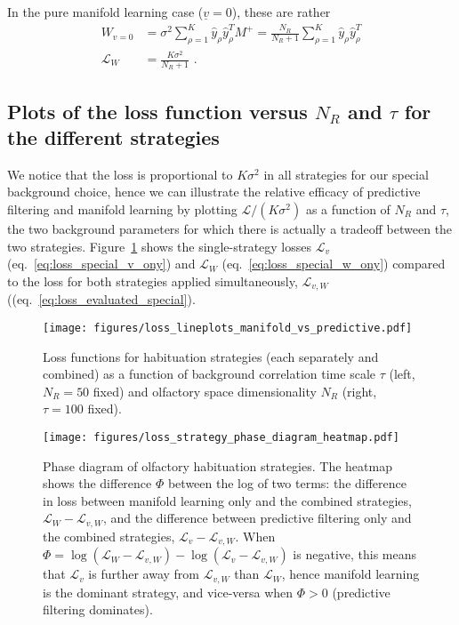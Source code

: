 \documentclass[letter, 12pt]{article}
\begin{document}
In the pure manifold learning case ($\underline{v} = 0$), these are rather
\begin{align}
	W_{v=0} &= \sigma^2 \sum_{\rho=1}^K \hat{y}_{\rho} \hat{y}_{\rho}^T M^+ =  \frac{N_R}{N_R + 1} \sum_{\rho=1}^K \hat{y}_{\rho} \hat{y}_{\rho}^T  \\
	\mathcal{L}_W &= \frac{K \sigma^2}{N_R + 1}
	\label{eq:loss_special_w_only} \,\, .
\end{align}


\subsection{Plots of the loss function versus $N_R$ and $\tau$ for the different strategies}
\label{subsec:plots}
We notice that the loss is proportional to $K \sigma^2$ in all strategies for our special background choice, hence we can illustrate the relative efficacy of predictive filtering and manifold learning by plotting $\mathcal{L} / (K\sigma^2)$ as a function of $N_R$ and $\tau$, the two background parameters for which there is actually a tradeoff between the two strategies. Figure~\ref{fig:loss} shows the single-strategy losses $\mathcal{L}_v$ (eq.~\ref{eq:loss_special_v_ony}) and $\mathcal{L}_W$ (eq.~\ref{eq:loss_special_w_ony})  compared to the loss for both strategies applied simultaneously, $\mathcal{L}_{v, W}$ ((eq.~\ref{eq:loss_evaluated_special}). 

\begin{figure}[htb]
	\centering
	\texttt{[image: figures/loss\_lineplots\_manifold\_vs\_predictive.pdf]}
	\caption{Loss functions for habituation strategies (each separately and combined) as a function of background correlation time scale $\tau$ (left, $N_R = 50$ fixed) and olfactory space dimensionality $N_R$ (right, $\tau = 100$ fixed). }
	\label{fig:loss}
\end{figure}
\begin{figure}[htb]
	\centering
	\texttt{[image: figures/loss\_strategy\_phase\_diagram\_heatmap.pdf]}
	\caption{Phase diagram of olfactory habituation strategies. The heatmap shows the difference $\Phi$ between the log of two terms: the difference in loss between manifold learning only and the combined strategies, $\mathcal{L}_W - \mathcal{L}_{v,W}$, and the difference between predictive filtering only and the combined strategies, $\mathcal{L}_v - \mathcal{L}_{v,W}$. When $\Phi = \log(\mathcal{L}_W - \mathcal{L}_{v,W}) - \log(\mathcal{L}_v - \mathcal{L}_{v,W})$ is negative, this means that $\mathcal{L}_v$ is further away from $\mathcal{L}_{v, W}$ than $\mathcal{L}_W$, hence manifold learning is the dominant strategy, and vice-versa when $\Phi > 0$ (predictive filtering dominates). }
	\label{fig:phase_diagram}
\end{figure}
\end{document}
